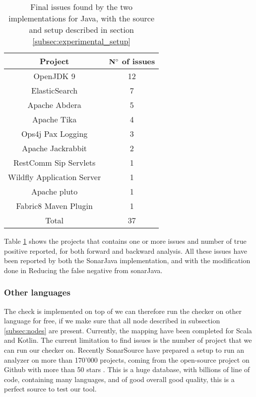 \begin{table}[h]
	\centering
	\caption{Final issues found by the two implementations for Java, with the source and setup described in section \ref{subsec:experimental_setup}}
	\label{table:issues-per-project}
	\begin{tabular}{|c|c|}
		\hline
		\bf Project & \bf $\bf N^{\circ}$  of issues\\ \hline
		OpenJDK 9 & 12 \\
		ElasticSearch & 7 \\
		Apache Abdera & 5 \\
		Apache Tika & 	4 \\
		Ops4j Pax Logging & 3 \\
		Apache Jackrabbit & 2 \\
		RestComm Sip Servlets & 1 \\
		Wildfly Application Server & 1 \\
		Apache pluto & 1 \\
		Fabric8 Maven Plugin & 1 \\\hline
		Total &  37 \\ \hline
	\end{tabular}
\end{table}


Table \ref{table:issues-per-project} shows the projects that contains one or more issues and number of true positive reported, for both forward and backward analysis. 
All these issues have been reported by both the SonarJava implementation, and \slang{} with the modification done in Reducing the false negative from sonarJava.

\subsubsection{Other languages}
\label{subsubsec:other_languages}
The check is implemented on top of \slang{} we can therefore run the checker on other language for free, if we make sure that all node described in subsection \ref{subsec:nodes} are present. Currently, the mapping have been completed for Scala and Kotlin.
The current limitation to find issues is the number of project that we can run our checker on. Recently SonarSource have prepared a setup to run an analyzer on more than 170'000 projects, coming from the open-source project on Github with more than 50 stars \cite{sourced:2019:Online}. 
This is a huge database, with billions of line of code, containing many languages, and of good overall good quality, this is a perfect source to test our tool.

